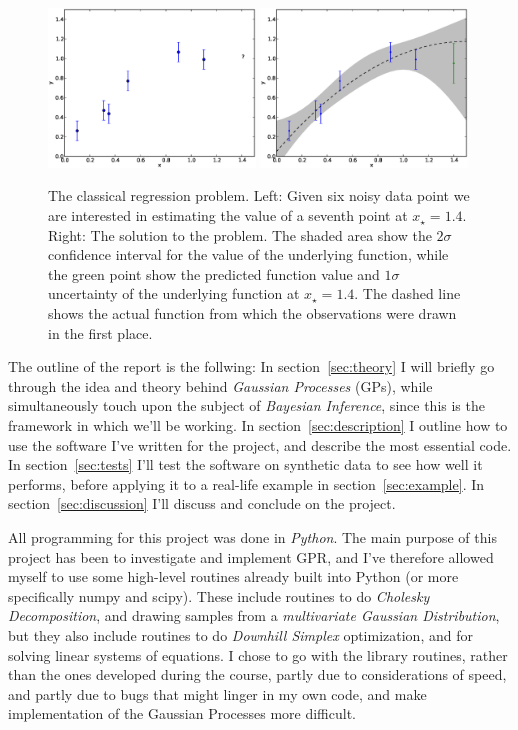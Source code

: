 \documentclass[a4paper,11pt,article,oneside]{memoir}
\begin{document}
\begin{figure}[htb]
\centering
\includegraphics[width=0.49\textwidth]{fig1} \includegraphics[width=0.49\textwidth]{fig2}
\caption{The classical regression problem. Left: Given six noisy data point we are interested in estimating the value of a seventh point at $x_\star=1.4$. Right: The solution to the problem. The shaded area show the $2\sigma$ confidence interval for the value of the underlying function, while the green point show the predicted function value and $1\sigma$ uncertainty of the underlying function at $x_\star=1.4$. The dashed line shows the actual function from which the observations were drawn in the first place.}
\label{fig:regression}
\end{figure}

The outline of the report is the follwing: In section~\ref{sec:theory} I will briefly go through the idea and theory behind \emph{Gaussian Processes} (GPs), while simultaneously touch upon the subject of \emph{Bayesian Inference}, since this is the framework in which we'll be working. In section~\ref{sec:description} I outline how to use the software I've written for the project, and describe the most essential code. In section~\ref{sec:tests} I'll test the software on synthetic data to see how well it performs, before applying it to a real-life example in section~\ref{sec:example}. In section~\ref{sec:discussion} I'll discuss and conclude on the project.

All programming for this project was done in \emph{Python}. The main purpose of this project has been to investigate and implement GPR, and I've therefore allowed myself to use some high-level routines already built into Python (or more specifically numpy and scipy). These include routines to do \emph{Cholesky Decomposition}, and drawing samples from a \emph{multivariate Gaussian Distribution}, but they also include routines to do \emph{Downhill Simplex} optimization, and for solving linear systems of equations. I chose to go with the library routines, rather than the ones developed during the course, partly due to considerations of speed, and partly due to bugs that might linger in my own code, and make implementation of the Gaussian Processes more difficult.
\end{document}
